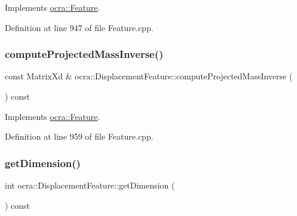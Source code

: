Implements \hyperlink{classocra_1_1Feature_ac529096b3fe8eba1ab88a56d8b042d37}{ocra\+::\+Feature}.



Definition at line 947 of file Feature.\+cpp.

\hypertarget{classocra_1_1DisplacementFeature_a3639d72ab7b85ac4b9533ed6498c0c03}{}\label{classocra_1_1DisplacementFeature_a3639d72ab7b85ac4b9533ed6498c0c03} 
\subsubsection{\texorpdfstring{compute\+Projected\+Mass\+Inverse()}{computeProjectedMassInverse()}\hspace{0.1cm}{\footnotesize\ttfamily [2/2]}}
{\footnotesize\ttfamily const Matrix\+Xd \& ocra\+::\+Displacement\+Feature\+::compute\+Projected\+Mass\+Inverse (\begin{DoxyParamCaption}{ }\end{DoxyParamCaption}) const\hspace{0.3cm}{\ttfamily [virtual]}}



Implements \hyperlink{classocra_1_1Feature_ac27bcbdbb8541e3b4e2c77a6d6f2ffc0}{ocra\+::\+Feature}.



Definition at line 959 of file Feature.\+cpp.

\hypertarget{classocra_1_1DisplacementFeature_a5d6548c921c2ce61374d3f76114b7881}{}\label{classocra_1_1DisplacementFeature_a5d6548c921c2ce61374d3f76114b7881} 
\subsubsection{\texorpdfstring{get\+Dimension()}{getDimension()}}
{\footnotesize\ttfamily int ocra\+::\+Displacement\+Feature\+::get\+Dimension (\begin{DoxyParamCaption}{ }\end{DoxyParamCaption}) const\hspace{0.3cm}{\ttfamily [virtual]}}



